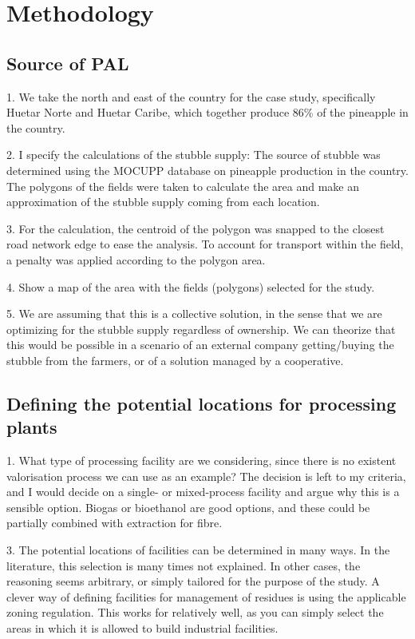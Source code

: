 \section{Methodology}

\subsection{Source of PAL}

1. We take the north and east of the country for the case study, specifically Huetar Norte and Huetar Caribe, which together produce 86\% of the pineapple in the country. 

2. I specify the calculations of the stubble supply: The source of stubble was determined using the MOCUPP database on pineapple production in the country. The polygons of the fields were taken to calculate the area and make an approximation of the stubble supply coming from each location. 

3. For the calculation, the centroid of the polygon was snapped to the closest road network edge to ease the analysis. To account for transport within the field, a penalty was applied according to the polygon area. 

4. Show a map of the area with the fields (polygons) selected for the study. 

5. We are assuming that this is a collective solution, in the sense that we are optimizing for the stubble supply regardless of ownership. We can theorize that this would be possible in a scenario of an external company getting/buying the stubble from the farmers, or of a solution managed by a cooperative. 


\subsection{Defining the potential locations for processing plants}

1. What type of processing facility are we considering, since there is no existent valorisation process we can use as an example? The decision is left to my criteria, and I would decide on a single- or mixed-process facility and argue why this is a sensible option. Biogas or bioethanol are good options, and these could be partially combined with extraction for fibre. 

3. The potential locations of facilities can be determined in many ways. In the literature, this selection is many times not explained. In other cases, the reasoning seems arbitrary, or simply tailored for the purpose of the study. A clever way of defining facilities for management of residues is using the applicable zoning regulation. This works for relatively well, as you can simply select the areas in which it is allowed to build industrial facilities.

